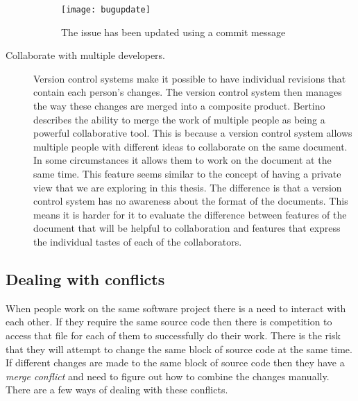 \begin{description}
  \begin{figure}[!t]
   \begin{center}
    \texttt{[image: bugupdate]}
   \end{center}
   \caption{The issue has been updated using a commit message}
   \label{fig:bgBugUpdate}
  \end{figure}

  \item [Collaborate with multiple developers.]
  Version control systems make it possible to have individual revisions that contain each person's changes. 
  The version control system then manages the way these changes are merged into a composite product. 
  Bertino \cite{Bertino2012} describes the ability to merge the work of multiple people as being a powerful collaborative tool. 
  This is because a version control system allows multiple people with different ideas to collaborate on the same document. 
  In some circumstances it allows them to work on the document at the same time. This feature seems similar to the concept of having a private view that we are exploring in this thesis. The difference is that a version control system has no awareness about the format of the documents. This means it is harder for it to evaluate the difference between features of the document that will be helpful to collaboration and features that express the individual tastes of each of the collaborators.

\end{description}

\subsection{Dealing with conflicts}
When people work on the same software project there is a need to interact with each other.
If they require the same source code then there is competition to access that file for each of them to successfully do their work.
There is the risk that they will attempt to change the same block of source code at the same time.
If different changes are made to the same block of source code then they have a \emph{merge conflict} and need to figure out how to combine the changes manually.
There are a few ways of dealing with these conflicts.

